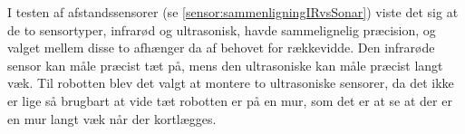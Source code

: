 I testen af afstandssensorer (se \cref{sensor:sammenligningIRvsSonar}) viste det sig at de to sensortyper, infrarød og ultrasonisk, havde sammelignelig præcision, og valget mellem disse to afhænger da af behovet for rækkevidde. 
Den infrarøde sensor kan måle præcist tæt på, mens den ultrasoniske kan måle præcist langt væk.
Til robotten blev det valgt at montere to ultrasoniske sensorer, da det ikke er lige så brugbart at vide tæt robotten er på en mur, som det er at se at der er en mur langt væk når der kortlægges.
